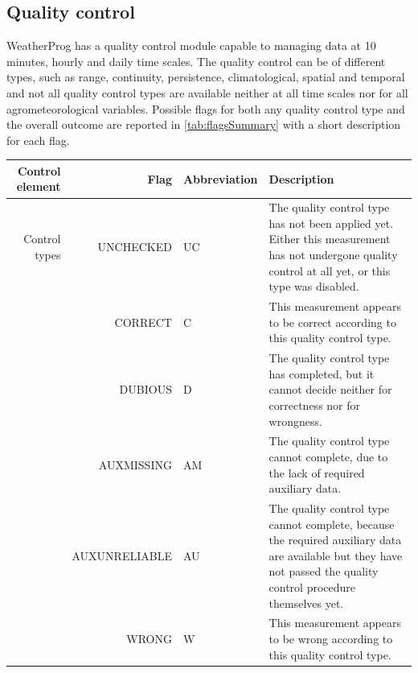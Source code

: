 \documentclass[authoryear,preprint,review,12pt]{elsarticle}
\begin{document}
\subsection{Quality control} \label{sec:qcheck}
WeatherProg has a quality control module capable to managing data at 10 minutes, hourly and daily time scales.
The quality control can be of different types, such as range, continuity, persistence, climatological, spatial and temporal and not all quality control types are available neither at all time scales nor for all agrometeorological variables.
Possible flags for both any quality control type and the overall outcome are reported in \cref{tab:flagsSummary} with a short description for each flag.
\begin{table}[]
    \begin{scriptsize}
    \centering
    \begin{tabular}{r r l p{7cm}}
    \hline
    Control element & Flag & Abbreviation & Description \\
    \hline
	Control types & UNCHECKED     & UC & The quality control type has not been applied yet. Either this measurement has not undergone quality control at all yet, or this type was disabled.\\
	& CORRECT       & C  & This measurement appears to be correct according to this quality control type. \\
	& DUBIOUS       & D  & The quality control type has completed, but it cannot decide neither for correctness nor for wrongness. \\
	& AUXMISSING    & AM & The quality control type cannot complete, due to the lack of required auxiliary data. \\
	& AUXUNRELIABLE & AU & The quality control type cannot complete, because the required auxiliary data are available but they have not passed the quality control procedure themselves yet. \\
	& WRONG         & W  & This measurement appears to be wrong according to this quality control type. \\
 
    \hline


\end{tabular}
\end{scriptsize}
\end{table}
\end{document}
